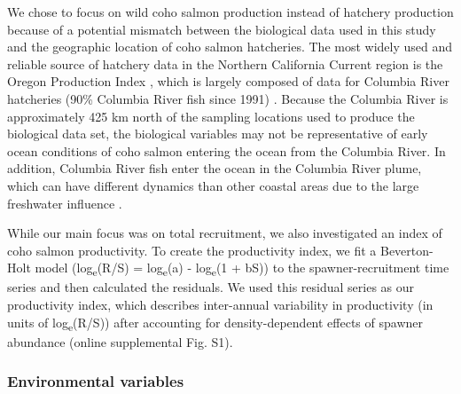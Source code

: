 We chose to focus on wild coho salmon production instead of hatchery production
because of a potential mismatch between the biological data used in this study
and the geographic location of coho salmon hatcheries. The most widely used and
reliable source of hatchery data in the Northern California Current region is
the Oregon Production Index \citep{Logerwell2003a, Koslow2002a, Cole2000a},
which is largely composed of data for Columbia River hatcheries (90\% Columbia
River fish since 1991) \citep{PFMC2013}. Because the Columbia River is
approximately 425 km north of the sampling locations used to produce the
biological data set, the biological variables may not be representative of early
ocean conditions of coho salmon entering the ocean from the Columbia River. In
addition, Columbia River fish enter the ocean in the Columbia River plume, which
can have different dynamics than other coastal areas due to the large freshwater
influence \citep{Hickey1998}.

While our main focus was on total recruitment, we also investigated an index of
coho salmon productivity. To create the productivity index, we fit a
Beverton-Holt model (log\textsubscript{e}(R/S) = log\textsubscript{e}(a) -
log\textsubscript{e}(1 + bS)) \citep{Beverton1957a} to the spawner-recruitment
time series and then calculated the residuals. We used this residual series as
our productivity index, which describes inter-annual variability in productivity
(in units of log\textsubscript{e}(R/S)) after accounting for density-dependent
effects of spawner abundance (online supplemental Fig. S1).


\subsubsection{Environmental variables}

